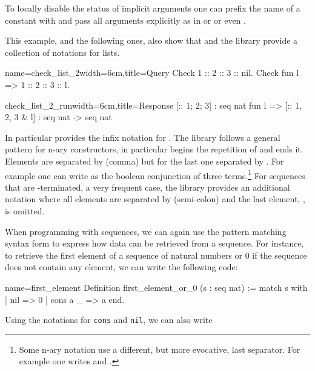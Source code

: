 To locally disable the
status of implicit arguments one can prefix the name of a
constant with  and pass all arguments explicitly as in
 or  or even
.

This example, and the following ones, also show
that \Coq{} and the \mcbMC{} library provide
a collection of notations for lists.

\begin{coq}{name=check_list_2}{width=6cm,title=Query}
Check 1 :: 2 :: 3 :: nil.
Check fun l => 1 :: 2 :: 3 :: l.
$~$
\end{coq}
\begin{coqout}{check_list_2_run}{width=6cm,title=Response}
[:: 1; 2; 3] : seq nat
fun l => [:: 1, 2, 3 & l]
  : seq nat -> seq nat
\end{coqout}
\index[coq]{\C{[:: .. , .. & ..]}}

In particular \Coq{} provides the infix notation \C{::} for
.  The \mcbMC{} library follows a general pattern for
n-ary constructors, in particular \C{[::} begins the repetition
of \C{::} and \C{]} ends it.  Elements are separated by \C{,} (comma)
but for the last one separated by \C{&}.
For example one
can write as  the boolean conjunction
of three terms.\footnote{Some n-ary notation use a
different, but more evocative, last separator.  For example one writes
\C{[|| b1, b2 | b3]} and \C{[==> b1, b2 => b3]}.}
\index[coq]{\C{["|"| .. , .. "| ..]}}
\index[coq]{\C{[&& .. , .. & ..]}}
\index[coq]{\C{[==> .. , .. => ..]}}
For sequences that are -terminated, a very frequent case,
the \mcbMC{} library provides an additional notation where all elements are
separated by \C{;} (semi-colon) and the last element, ,
is omitted.
\index[coq]{\C{[seq .. ; ..]}}

When programming with sequences, we can again use the  pattern matching
syntax form to express how data can be retrieved from a sequence.  For
instance, to retrieve the first element of a sequence of natural numbers
or 0 if the sequence does not contain any element, we can write the
following code:

\begin{coq}{name=first_element}{}
Definition first_element_or_0 (s : seq nat) :=
  match s with
  | nil => 0
  | cons a _ => a
  end.
\end{coq}
Using the notations for {\tt cons} and {\tt nil}, we can also write

